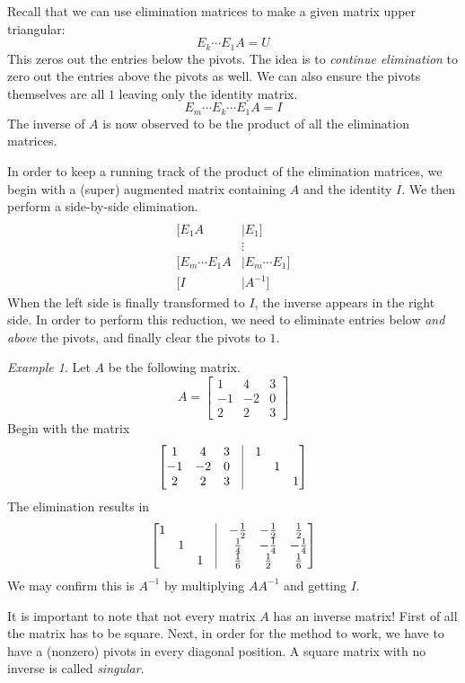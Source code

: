 \documentclass[11pt,oneside]{amsbook}
\theoremstyle{definition}
\theoremstyle{plain}
\theoremstyle{definition}
\theoremstyle{remark}
\newtheorem{example}[theorem]{Example}
\numberwithin{equation}{section}
\numberwithin{figure}{section}
\begin{document}
Recall that we can use elimination matrices to make a given matrix upper triangular:
\[E_k\cdots E_1A=U
\]
This zeros out the entries below the pivots. The idea is to \emph{continue elimination} to zero out the entries above the pivots as well. We can also ensure the pivots themselves are all $1$ leaving only the identity matrix.
\[E_m\cdots E_k\cdots E_1A=I
\]
The inverse of $A$ is now observed to be the product of all the elimination matrices.

In order to keep a running track of the product of the elimination matrices, we begin with a (super) augmented matrix containing $A$ and the identity $I$. We then perform a side-by-side elimination.
\begin{align*}
  [A&\mid I]\\
  [E_1A&\mid E_1]\\
    &\vdots\\
  [E_m\cdots E_1A&\mid E_m\cdots E_1]\\
  [I&\mid A^{-1}]
\end{align*}
When the left side is finally transformed to $I$, the inverse appears in the right side. In order to perform this reduction, we need to eliminate entries below \emph{and above} the pivots, and finally clear the pivots to $1$.

\begin{example}
  Let $A$ be the following matrix.
  \[A=\begin{bmatrix}1&4&3\\-1&-2&0\\2&2&3\end{bmatrix}
  \]
  Begin with the matrix
  \[\begin{bmatrix}
    1&4&3&\vline&1\\
    -1&-2&0&\vline&&1\\
    2&2&3&\vline&&&1
    \end{bmatrix}
  \]
  The elimination results in
  \[\begin{bmatrix}
    1&&&\vline&-\frac12&-\frac12&\frac12\\
    &1&&\vline&\frac14&-\frac14&-\frac14\\
    &&1&\vline&\frac16&\frac12&\frac16
    \end{bmatrix}
  \]
  We may confirm this is $A^{-1}$ by multiplying $AA^{-1}$ and getting $I$.
\end{example}

It is important to note that not every matrix $A$ has an inverse matrix! First of all the matrix has to be square. Next, in order for the method to work, we have to have a (nonzero) pivots in every diagonal position. A square matrix with no inverse is called \emph{singular}.
\end{document}
